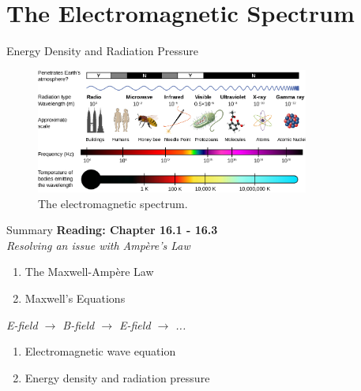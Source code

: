 \documentclass{beamer}
\begin{document}
\section{The Electromagnetic Spectrum}

\begin{frame}{Energy Density and Radiation Pressure}
\begin{figure}
\centering
\includegraphics[width=0.8\textwidth]{figures/spectrum.jpeg}
\caption{\label{fig:spectrum} The electromagnetic spectrum.}
\end{figure}
\end{frame}

\begin{frame}{Summary}
\textbf{Reading: Chapter 16.1 - 16.3} \\ \vspace{0.5cm}
\textit{Resolving an issue with Amp\`{e}re's Law}
\begin{enumerate}
\item The Maxwell-Amp\`{e}re Law
\item Maxwell's Equations
\end{enumerate}
\textit{E-field $\rightarrow$ B-field $\rightarrow$ E-field $\rightarrow$ ...}
\begin{enumerate}
\item Electromagnetic wave equation
\item Energy density and radiation pressure
\end{enumerate}
\end{frame}
\end{document}
